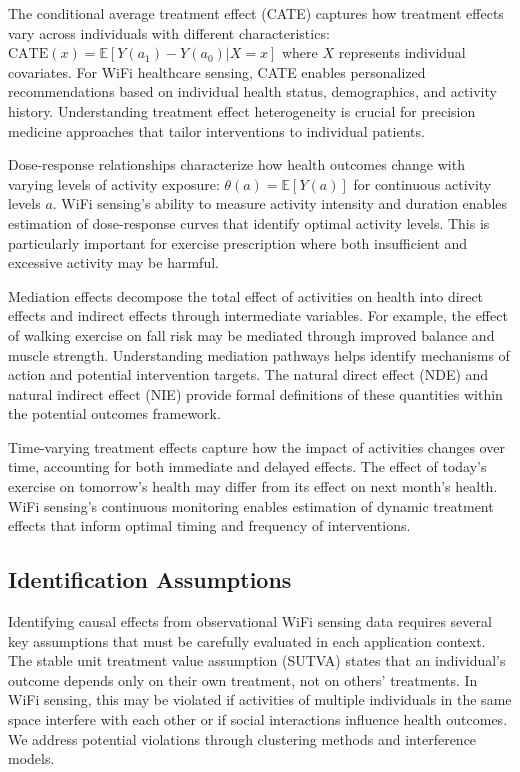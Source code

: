 \documentclass[journal]{IEEEtran}
\begin{document}
The conditional average treatment effect (CATE) captures how treatment effects vary across individuals with different characteristics: $\text{CATE}(x) = \mathbb{E}[Y(a_1) - Y(a_0) | X = x]$ where $X$ represents individual covariates. For WiFi healthcare sensing, CATE enables personalized recommendations based on individual health status, demographics, and activity history. Understanding treatment effect heterogeneity is crucial for precision medicine approaches that tailor interventions to individual patients.

Dose-response relationships characterize how health outcomes change with varying levels of activity exposure: $\theta(a) = \mathbb{E}[Y(a)]$ for continuous activity levels $a$. WiFi sensing's ability to measure activity intensity and duration enables estimation of dose-response curves that identify optimal activity levels. This is particularly important for exercise prescription where both insufficient and excessive activity may be harmful.

Mediation effects decompose the total effect of activities on health into direct effects and indirect effects through intermediate variables. For example, the effect of walking exercise on fall risk may be mediated through improved balance and muscle strength. Understanding mediation pathways helps identify mechanisms of action and potential intervention targets. The natural direct effect (NDE) and natural indirect effect (NIE) provide formal definitions of these quantities within the potential outcomes framework.

Time-varying treatment effects capture how the impact of activities changes over time, accounting for both immediate and delayed effects. The effect of today's exercise on tomorrow's health may differ from its effect on next month's health. WiFi sensing's continuous monitoring enables estimation of dynamic treatment effects that inform optimal timing and frequency of interventions.

\subsection{Identification Assumptions}

Identifying causal effects from observational WiFi sensing data requires several key assumptions that must be carefully evaluated in each application context. The stable unit treatment value assumption (SUTVA) states that an individual's outcome depends only on their own treatment, not on others' treatments. In WiFi sensing, this may be violated if activities of multiple individuals in the same space interfere with each other or if social interactions influence health outcomes. We address potential violations through clustering methods and interference models.
\end{document}
